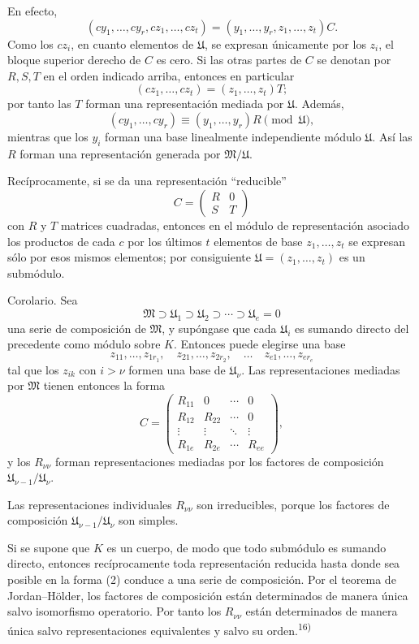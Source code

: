 \documentclass[11pt]{article}
\providecommand{\mM}{\mathfrak{M}}
\providecommand{\mU}{\mathfrak{U}}
\begin{document}
En efecto,
\[
        (cy_1,\ldots,cy_r,cz_1,\ldots,cz_t)
        =(y_1,\ldots,y_r,z_1,\ldots,z_t)C.
\]
Como los $cz_i$, en cuanto elementos de $\mU$, se expresan únicamente por los $z_i$, el bloque superior derecho de $C$ es cero. Si las otras partes de $C$ se denotan por $R,S,T$ en el orden indicado arriba, entonces en particular
\[
        (cz_1,\ldots,cz_t)=(z_1,\ldots,z_t)T;
\]
por tanto las $T$ forman una representación mediada por $\mU$. Además,
\[
        (cy_1,\ldots,cy_r)\equiv (y_1,\ldots,y_r)R \pmod{\mU},
\]
mientras que los $y_i$ forman una base linealmente independiente módulo $\mU$. Así las $R$ forman una representación generada por $\mM/\mU$.

Recíprocamente, si se da una representación ``reducible''
\[
        C=\begin{pmatrix}R&0\\ S&T\end{pmatrix}
\]
con $R$ y $T$ matrices cuadradas, entonces en el módulo de representación asociado los productos de cada $c$ por los últimos $t$ elementos de base $z_1,\ldots,z_t$ se expresan sólo por esos mismos elementos; por consiguiente $\mU=(z_1,\ldots,z_t)$ es un submódulo.

Corolario. Sea
\[
        \mM\supset \mU_1\supset \mU_2\supset\cdots\supset \mU_e=0
\]
una serie de composición de $\mM$, y supóngase que cada $\mU_i$ es sumando directo del precedente como módulo sobre $K$. Entonces puede elegirse una base
\[
        z_{11},\ldots,z_{1r_1},\quad
        z_{21},\ldots,z_{2r_2},\quad\ldots\quad
        z_{e1},\ldots,z_{er_e}
\]
tal que los $z_{ik}$ con $i>\nu$ formen una base de $\mU_\nu$. Las representaciones mediadas por $\mM$ tienen entonces la forma
\[
 C=\begin{pmatrix}
 R_{11}&0&\cdots&0\\
 R_{12}&R_{22}&\cdots&0\\
 \vdots&\vdots&\ddots&\vdots\\
 R_{1e}&R_{2e}&\cdots&R_{ee}
 \end{pmatrix},                                      \tag{2}
\]
y los $R_{\nu\nu}$ forman representaciones mediadas por los factores de composición $\mU_{\nu-1}/\mU_\nu$.

Las representaciones individuales $R_{\nu\nu}$ son irreducibles, porque los factores de composición $\mU_{\nu-1}/\mU_\nu$ son simples.

Si se supone que $K$ es un cuerpo, de modo que todo submódulo es sumando directo, entonces recíprocamente toda representación reducida hasta donde sea posible en la forma (2) conduce a una serie de composición. Por el teorema de Jordan--Hölder, los factores de composición están determinados de manera única salvo isomorfismo operatorio. Por tanto los $R_{\nu\nu}$ están determinados de manera única salvo representaciones equivalentes y salvo su orden.\textsuperscript{16)}
\end{document}
